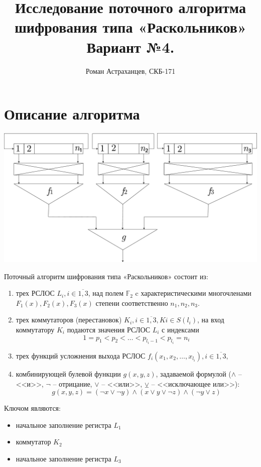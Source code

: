 \documentclass[a4paper,12pt]{article}
\title{Исследование поточного алгоритма шифрования типа «Раскольников» \linebreak Вариант №4.}
\author{Роман Астраханцев, СКБ-171}
\theoremstyle{definition}
\begin{document}
	\maketitle
	
	\section*{Описание алгоритма}

	\includegraphics[width=\textwidth]{cipher}


	Поточный алгоритм шифрования типа «Раскольников» состоит из:
	
	\begin{enumerate}
	\item трех РСЛОС $L_i, i \in \overline{1,3}$, над полем $\mathbb{F}_2$ c характеристическими многочленами
	$F_1(x), F_2(x), F_3(x)$ степени соответственно $n_1, n_2, n_3$.
	
	\item трех коммутаторов (перестановок) $K_i, i \in \overline{1,3}, Ki \in S (l_i)$, на вход коммутатору $K_i$
	подаются значения РСЛОС $L_i$ с индексами
	\[ 1 = p_1 < p_2 < \dots < p_{l_i-1} < p_{l_i} = n_i \]

	\item трех функций усложнения выхода РСЛОС $f_i (x_1, x_2, \dots, x_{l_i}), i \in \overline{1,3},$ 
	
	\item комбинирующей булевой функции $g(x,y,z)$, задаваемой формулой ($\land$ -- <<и>>, $\neg$ -- отрицание, $\lor$ -- <<или>>, $\veebar$ -- <<исключающее или>>):
	\[ g(x,y,z) = (\neg x \lor \neg y) \land (x \lor y \lor \neg z) \land (\neg y \lor z) \]
	
	\end{enumerate}

	Ключом являются:
	
	\begin{itemize}[topsep=0pt, itemsep=0pt, parsep=0pt]
	\item начальное заполнение регистра $L_1$
	\item коммутатор $K_2$
	\item начальное заполнение регистра $L_3$
	\end{itemize}
\end{document}
